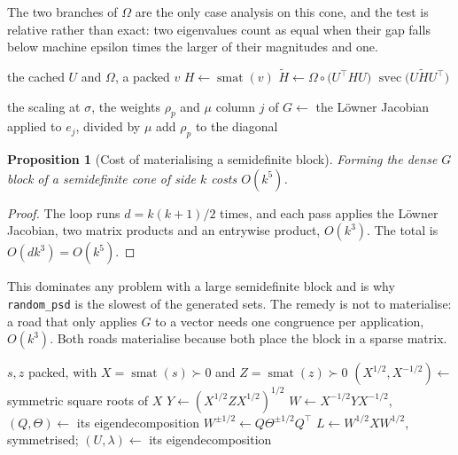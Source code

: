 \documentclass[a4paper,11pt]{book}
\theoremstyle{plain}
\newtheorem{proposition}[theorem]{Proposition}
\theoremstyle{definition}
\theoremstyle{remark}
\numberwithin{equation}{chapter}
\numberwithin{algorithm}{chapter}
\newcommand{\svec}{\operatorname{svec}}
\newcommand{\smat}{\operatorname{smat}}
\begin{document}
	The two branches of $\Omega$ are the only case analysis on this cone, and the
	test is relative rather than exact: two eigenvalues count as equal when their
	gap falls below machine epsilon times the larger of their magnitudes and one.

	\begin{algorithm}[H]
		\caption{Applying the Löwner Jacobian}
		\begin{algorithmic}[1]
			\Require the cached $U$ and $\Omega$, a packed $v$
			\State $H\gets\smat(v)$
			\State $\widetilde H\gets\Omega\circ\bigl(U^{\top}HU\bigr)$
			\State \Return $\svec\bigl(U\widetilde HU^{\top}\bigr)$
		\end{algorithmic}
	\end{algorithm}

	\begin{algorithm}[H]
		\caption{Materialising the $G$ block}
		\begin{algorithmic}[1]
			\Require the scaling at $\sigma$, the weights $\rho_p$ and $\mu$
			\State column $j$ of $G\gets$ the Löwner Jacobian applied to $e_j$,
			divided by $\mu$
			\EndFor
			\State add $\rho_p$ to the diagonal
		\end{algorithmic}
	\end{algorithm}

	\begin{proposition}[Cost of materialising a semidefinite block]
		\label{prop:psdcost}
		Forming the dense $G$ block of a semidefinite cone of side $k$ costs
		$O(k^5)$.
	\end{proposition}

	\begin{proof}
		The loop runs $d=k(k+1)/2$ times, and each pass applies the Löwner
		Jacobian, two matrix products and an entrywise product, $O(k^3)$. The total
		is $O(dk^3)=O(k^5)$.
	\end{proof}

	This dominates any problem with a large semidefinite block and is why
	\texttt{random\_psd} is the slowest of the generated sets. The remedy is not
	to materialise: a road that only applies $G$ to a vector needs one congruence
	per application, $O(k^3)$. Both roads materialise because both place the block
	in a sparse matrix.

	\begin{algorithm}[H]
		\caption{Nesterov and Todd scaling for the semidefinite cone}
		\begin{algorithmic}[1]
			\Require $s,z$ packed, with $X=\smat(s)\succ0$ and $Z=\smat(z)\succ0$
			\State $(X^{1/2},X^{-1/2})\gets$ symmetric square roots of $X$
			\State $Y\gets(X^{1/2}ZX^{1/2})^{1/2}$ 
			\State $W\gets X^{-1/2}YX^{-1/2}$, \quad $(Q,\Theta)\gets$ its
			eigendecomposition 
			\State $W^{\pm1/2}\gets Q\Theta^{\pm1/2}Q^{\top}$
			\State $L\gets W^{1/2}XW^{1/2}$, symmetrised; $(U,\lambda)\gets$ its
			eigendecomposition 
		\end{algorithmic}
	\end{algorithm}
\end{document}
